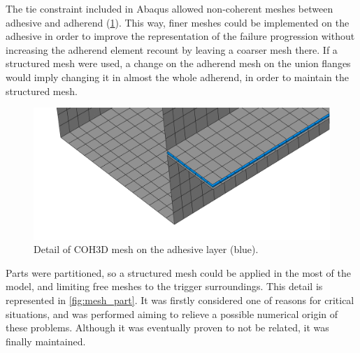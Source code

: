 \documentclass[cmfonts]{witpress}
\begin{document}
The tie constraint included in Abaqus allowed non-coherent meshes between adhesive and adherend (\cref{fig:mesh_detail_coh3d_comparison}). This way, finer meshes could be implemented on the adhesive in order to improve the representation of the failure progression without increasing the adherend element recount by leaving a coarser mesh there. If a structured mesh were used, a change on the adherend mesh on the union flanges would imply changing it in almost the whole adherend, in order to maintain the structured mesh.

\begin{figure}
	\centering
	\includegraphics[width=0.7\linewidth]{figures/IMG_CUTRES/mesh_detail_coh3d_comparison}
	\caption[Detail of \acrlong{COH3D} mesh on the adhesive layer.]{Detail of \acrlong{COH3D} mesh on the adhesive layer (blue).}
	\label{fig:mesh_detail_coh3d_comparison}
\end{figure}

Parts were partitioned, so a structured mesh could be applied in the most of the model, and limiting free meshes to the trigger surroundings. This detail is represented in \cref{fig:mesh_part}. It was firstly considered one of reasons for critical situations, and was performed aiming to relieve a possible numerical origin of these problems. Although it was eventually proven to not be related, it was finally maintained.
\end{document}
